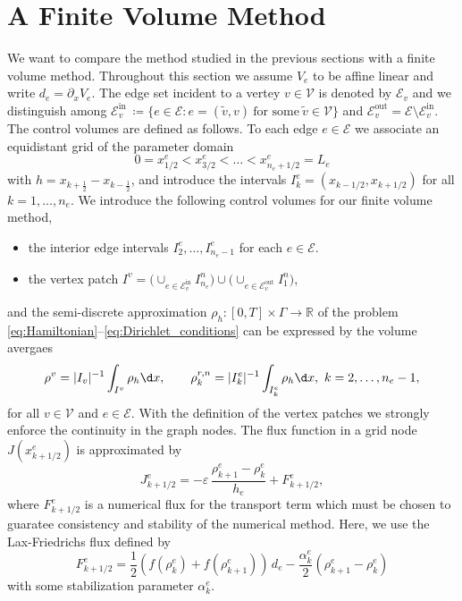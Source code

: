 \chapter{A Finite Volume Method}
\label{ch3}

We want to compare the method studied in the previous sections with a finite volume method. Throughout this section we assume $V_e$ to be affine linear and write $d_e = \partial_x V_e$. The edge set incident to a vertey $v\in \mathcal{V}$ is denoted by $\mathcal{E}_v$ and we distinguish among $\mathcal{E}_v^{\text{in}}\ \coloneqq \{e\in \mathcal{E}\colon e=(\widetilde v,v)\ \text{for some}\ \widetilde v\in \mathcal{V}\}$ and $\mathcal{E}_v^{\text{out}} = \mathcal{E} \setminus \mathcal{E}_v^{\text{in}}$. The control volumes are defined as follows. To each edge $e\in \mathcal{E}$ we associate an equidistant grid of the parameter domain
\begin{equation*}
	0 = x^e_{1/2} < x^e_{3/2} <\ldots < x^e_{n_e+1/2} = L_e
\end{equation*}
with $h=x_{k+\frac12} - x_{k-\frac12}$, and introduce the intervals $I_k^e = (x_{k-1/2}, x_{k+1/2})$ for all $k=1,\ldots,n_e$. We introduce the following control volumes for our finite volume method,
\begin{itemize}
	\item the interior edge intervals $I_2^e,\ldots,I_{n_e-1}^e$ for
	each $e\in \mathcal{E}$.
	\item the vertex patch $I^v = \big(\cup_{e\in \mathcal{E}_v^{\text{in}}} I_{n_e}^n\big)
	\cup \big(\cup_{e\in \mathcal{E}_v^{\text{out}}} I_1^n\big)$,
\end{itemize}
and the semi-discrete approximation $\rho_h \colon [0,T]\times\Gamma\to\mathbb{R}$ of the problem \eqref{eq:Hamiltonian}--\eqref{eq:Dirichlet_conditions} can be expressed by the volume avergaes
\begin{align*}	
	\rho^{v}= |I_v|^{-1}\int_{I^v}\rho_h\d x, \qquad
	\rho_k^{r,n} = |I_k^e|^{-1}\int_{I_k^e} \rho_h\d x,\ k=2,\ldots,n_e-1,
\end{align*}
for all $v\in \mathcal{V}$ and $e\in \mathcal{E}$. With the definition of the vertex patches we strongly enforce the continuity in the graph nodes. The flux function in a grid node $J(x^e_{k+1/2})$ is approximated by
\begin{equation*}
	J_{k+1/2}^e = -\varepsilon\,\frac{\rho_{k+1}^e-\rho_k^e}{h_e}
	+ F^e_{k+1/2},
\end{equation*}
where $F^e_{k+1/2}$ is a numerical flux for the transport term which must be chosen to guaratee consistency and stability of the numerical method. Here, we use the Lax-Friedrichs flux defined by
\begin{equation*}
	F^e_{k+1/2} = \frac12 (f(\rho_k^e) + f(\rho_{k+1}^e))\,d_e - \frac{\alpha_k^e}2
	(\rho_{k+1}^e - \rho_k^e) 
\end{equation*}
with some stabilization parameter $\alpha_k^e$.

